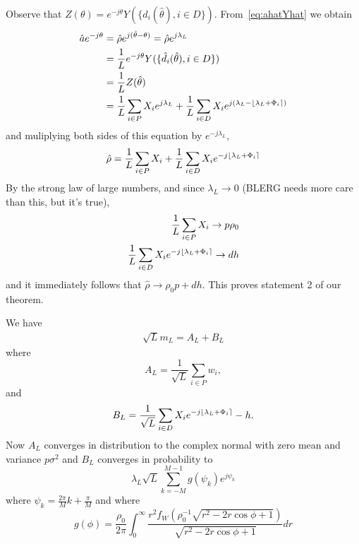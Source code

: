 \documentclass[journal]{IEEEtran}
\begin{document}
Observe that $Z(\theta) = e^{-j\theta}Y(\{\hat{d}_i(\hat{\theta}), i \in D\})$.  From~\eqref{eq:ahatYhat} we obtain
\begin{align}\label{eq:hata}
\hat{a} e^{-j\theta} &= \hat{\rho} e^{j(\hat{\theta} - \theta)} = \hat{\rho} e^{j\lambda_L} \nonumber \\
&= \frac{1}{L} e^{-j\theta} Y(\{\hat{d}_i(\hat{\theta}), i \in D\}) \nonumber \\
&= \frac{1}{L}  Z(\hat{\theta}) \nonumber \\
&= \frac{1}{L} \sum_{i \in P} X_i e^{j\lambda_L} + \frac{1}{L} \sum_{i \in D}X_i e^{j( \lambda_L  - {\left\lfloor \lambda_L + \Phi_i \right\rceil})} \label{eq:ahatfornorm}
\end{align}
and muliplying both sides of this equation by $e^{-j\lambda_L}$,
\[
\hat{\rho} =  \frac{1}{L}\sum_{i \in P} X_i + \frac{1}{L} \sum_{i \in D} X_i e^{-j{\left\lfloor \lambda_L + \Phi_i \right\rceil}}
\]
By the strong law of large numbers, and since $\lambda_L \rightarrow 0$ (BLERG needs more care than this, but it's true),
\begin{align*}
\frac{1}{L}\sum_{i \in P}X_i \rightarrow p \rho_0 \\
\frac{1}{L} \sum_{i \in D} X_i e^{-j{\left\lfloor \lambda_L + \Phi_i \right\rceil}} \rightarrow  d h 
\end{align*}
and it immediately follows that $\hat{\rho} \rightarrow \rho_0 p + d h$.  This proves statement 2 of our theorem.

We have
\begin{align*}
\sqrt{L} m_L =  A_L + B_L
\end{align*}
where
\[
A_L = \frac{1}{\sqrt{L}} \sum_{i \in P}w_i,
\]
and
\[
B_L = \frac{1}{\sqrt{L}} \sum_{i \in D}X_i e^{-j{\left\lfloor \lambda_L + \Phi_i \right\rceil}} - h.
\]
Now $A_L$ converges in distribution to the complex normal with zero mean and variance $p\sigma^2$ and $B_L$ converges in probability to
\[
\lambda_L \sqrt{L} \sum_{k=-M}^{M-1} g(\psi_k) e^{j\psi_k}
\]
where $\psi_k = \frac{2\pi}{M}k + \frac{\pi}{M}$ and where
\[
g(\phi) = \frac{\rho_0}{2\pi} \int_{0}^\infty \frac{r^2f_W(\rho_0^{-1}\sqrt{r^2 - 2r\cos\phi + 1})}{\sqrt{r^2 - 2r\cos\phi + 1}} dr
\]



\end{document}
